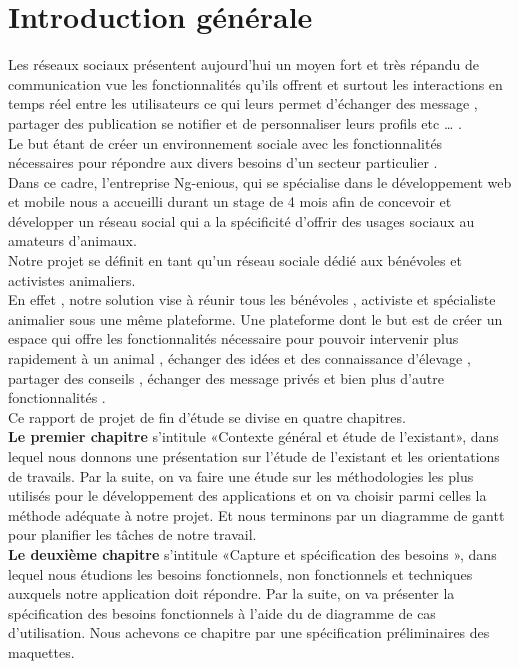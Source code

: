 \documentclass[11pt,a4paper,oneside]{book}
\begin{document}
	
	\frontmatter
	\pagestyle{plain}
	\chapter{Introduction générale}
	Les réseaux sociaux présentent aujourd’hui un moyen fort et très répandu de communication vue les fonctionnalités qu’ils offrent et surtout les interactions en temps réel entre les utilisateurs ce qui leurs permet d'échanger des message , partager des publication se notifier et de personnaliser leurs profils etc … .\\ Le but étant de créer un environnement sociale avec les fonctionnalités nécessaires pour répondre aux divers besoins d’un secteur particulier .\\
	
	Dans ce cadre, l’entreprise Ng-enious, qui se spécialise dans le développement web et mobile nous a accueilli durant un stage de 4 mois afin de concevoir et développer un réseau social qui a la spécificité d’offrir des usages sociaux au amateurs d’animaux.\\
	
	Notre projet se définit en tant qu’un réseau sociale dédié aux bénévoles et activistes animaliers.\\
	En effet , notre solution vise à réunir tous les bénévoles , activiste et spécialiste animalier sous une même plateforme. Une plateforme dont le but est de créer un espace qui offre les fonctionnalités nécessaire pour pouvoir intervenir plus rapidement à un animal , échanger des idées et des connaissance d’élevage , partager des conseils , échanger des message privés et bien plus d’autre fonctionnalités .\\	
	Ce rapport de projet de fin d’étude se divise en quatre chapitres.\\
	
	\textbf{Le premier chapitre} s'intitule «Contexte général et étude de l’existant», dans lequel nous donnons une présentation sur l’étude de l’existant et les orientations de travails. Par la suite, on va faire une étude sur les méthodologies les plus utilisés pour le développement des applications et on va choisir parmi celles la méthode adéquate à notre projet. Et nous terminons par un diagramme de gantt pour planifier les tâches de notre travail.\\
	
	\textbf{Le deuxième chapitre} s'intitule «Capture et spécification des besoins », dans lequel nous étudions les besoins fonctionnels, non fonctionnels et techniques auxquels notre application doit répondre. Par la suite, on va présenter la spécification des besoins fonctionnels à l’aide du de diagramme de cas d’utilisation. Nous achevons ce chapitre par une spécification préliminaires des maquettes. \\
	
\end{document}
